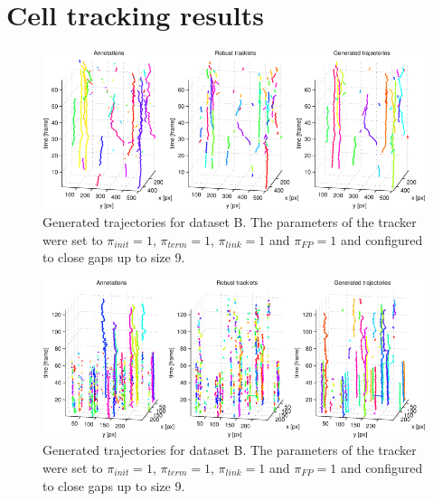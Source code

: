 \chapter{Cell tracking results}
	\label{app:appendix_trackingresults}

\begin{figure}
	\includegraphics[width=\textwidth]{images/fig_results_tracker_dataset_2}
	\caption{Generated trajectories for dataset B. The parameters of the tracker were set to $\pi_{init}=1$, $\pi_{term}=1$, $\pi_{link}=1$ and $\pi_{FP}=1$ and configured to close gaps up to size 9.}
	\label{fig:results_tracker_dataset_2}
\end{figure}


\begin{figure}
	\includegraphics[width=\textwidth]{images/fig_results_tracker_dataset_3}
	\caption{Generated trajectories for dataset B. The parameters of the tracker were set to $\pi_{init}=1$, $\pi_{term}=1$, $\pi_{link}=1$ and $\pi_{FP}=1$ and configured to close gaps up to size 9.}
	\label{fig:results_tracker_dataset_3}
\end{figure}

